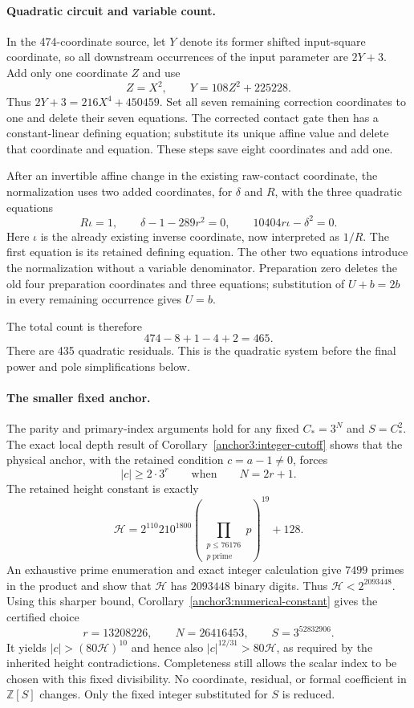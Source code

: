 \documentclass[11pt,a4paper]{article}
\theoremstyle{definition}
\theoremstyle{remark}
\begin{document}
\paragraph{Quadratic circuit and variable count.}
In the 474-coordinate source, let $Y$ denote its former shifted
input-square coordinate, so all downstream occurrences of the
input parameter are $2Y+3$. Add only one coordinate $Z$ and use
\[
                        Z=X^2,\qquad
                        Y=108Z^2+225228.
\]
Thus $2Y+3=216X^4+450459$. Set all seven remaining correction
coordinates to one and delete their seven equations. The corrected
contact gate then has a constant-linear defining equation; substitute
its unique affine value and delete that coordinate and equation.
These steps save eight coordinates and add one.

After an invertible affine change in the existing raw-contact
coordinate, the normalization uses two added coordinates, for
$\delta$ and $R$, with the three quadratic equations
\[
 R\iota=1,\qquad
 \delta-1-289r^2=0,\qquad
 10404r\iota-\delta^2=0.
\]
Here $\iota$ is the already existing inverse
coordinate, now interpreted as $1/R$. The first equation is its
retained defining equation. The other two equations introduce the
normalization without a variable denominator. Preparation zero
deletes the old four preparation coordinates and three equations;
substitution of $U+b=2b$ in every remaining occurrence gives $U=b$.

The total count is therefore
\[
                       474-8+1-4+2=465.
\]
There are 435 quadratic residuals. This is the quadratic system before the final power and pole simplifications below.

\paragraph{The smaller fixed anchor.}
The parity and primary-index arguments hold for any fixed
$C_*=3^N$ and $S=C_*^2$. The exact local depth result
of Corollary~\ref{anchor3:integer-cutoff} shows that the physical
anchor, with the retained condition $c=a-1\ne0$, forces
\[
 |c|\ge2\cdot3^r\qquad\text{when}\qquad N=2r+1.
\]
The retained height constant is exactly
\[
 \mathcal H=2^{110}210^{1800}
       \left(\prod_{\substack{p\le76176\\p\ \mathrm{prime}}}p\right)^{19}
       +128.
\]
An exhaustive prime enumeration and exact integer calculation give
$7499$ primes in the product and show that $\mathcal H$ has
$2093448$ binary digits. Thus $\mathcal H<2^{2093448}$.
Using this sharper bound,
Corollary~\ref{anchor3:numerical-constant} gives the certified choice
\[
 r=13208226,\qquad N=26416453,\qquad S=3^{52832906}.
\]
It yields $|c|>(80\mathcal H)^{10}$ and hence also
$|c|^{12/31}>80\mathcal H$, as required by the inherited
height contradictions. Completeness still allows the scalar index
to be chosen with this fixed divisibility. No coordinate, residual,
or formal coefficient in $\mathbb Z[S]$ changes. Only the fixed
integer substituted for $S$ is reduced.
\end{document}
